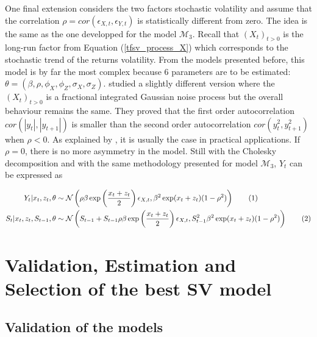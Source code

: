 \documentclass[11pt,a4,twosided,singlespacing,titlepagenumber=on]{scrreprt}
\numberwithin{equation}{chapter} %
\theoremstyle{remark}
\newcommand\numberthis{\addtocounter{equation}{1}\tag{\theequation}}
\begin{document}
One final extension considers the two factors stochastic volatility and assume that the correlation $\rho = cor(\epsilon_{X,t}, \epsilon_{Y,t})$ is statistically different from zero. The idea is the same as the one developped for the model $\mathcal{M}_3$. Recall that $(X_t)_{t>0}$ is the long-run factor from Equation (\ref{tfsv_process_X}) which corresponds to the stochastic trend of the returns volatility. From the models presented before, this model is by far the most complex because 6 parameters are to be estimated: $\theta = (\beta, \rho, \phi_X, \phi_Z, \sigma_X, \sigma_Z)$. \cite{ruiz2008} studied a slightly different version where the $(X_t)_{t>0}$ is a fractional integrated Gaussian noise process but the overall behaviour remains the same. They proved that the first order autocorrelation $cor(|y_t|,|y_{t+1}|)$ is smaller than the second order autocorrelation $cor(y_t^2,y_{t+1}^2)$ when $\rho < 0$. As explained by \cite{cont2005}, it is usually the case in practical applications. If $\rho = 0$, there is no more asymmetry in the model. Still with the Cholesky decomposition and with the same methodology presented for model $\mathcal{M}_3$, $Y_t$ can be expressed as

\begin{align*}
Y_t | x_t, z_t, \theta            &\sim \mathcal{N}\left(\rho \beta \exp \left(\frac{x_t + z_t}{2} \right) \epsilon_{X,t}, \beta^2 \exp(x_t + z_t) (1-\rho^2)\right) \numberthis \\
S_t | x_t, z_t, S_{t-1}, \theta   &\sim \mathcal{N}\left(S_{t-1} + S_{t-1} \rho \beta \exp \left(\frac{x_t + z_t}{2} \right) \epsilon_{X,t}, S_{t-1}^2 \beta^2 \exp(x_t + z_t) (1-\rho^2)\right) \numberthis
\end{align*}

\chapter{Validation, Estimation and Selection of the best SV model}

\section{Validation of the models}
\end{document}
